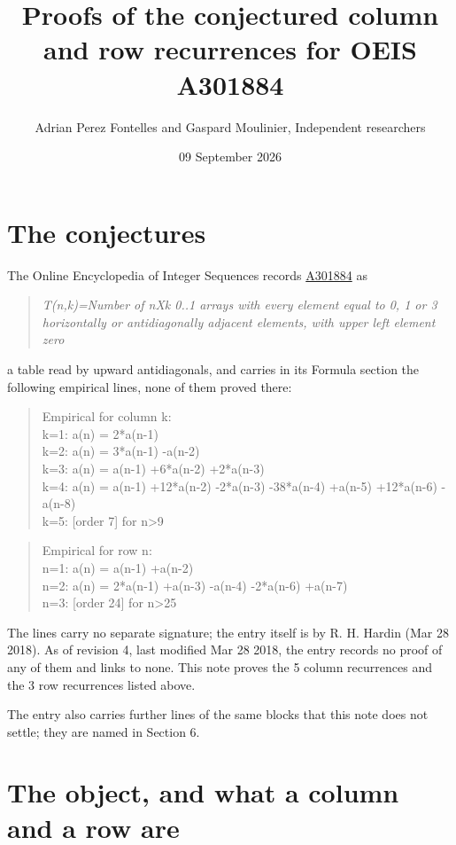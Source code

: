 \documentclass[11pt]{article}
\title{Proofs of the conjectured column and row recurrences for OEIS A301884}
\author{Adrian Perez Fontelles and Gaspard Moulinier, Independent researchers}
\date{09 September 2026}
\theoremstyle{definition}
\begin{document}
\maketitle
\section{The conjectures}

The Online Encyclopedia of Integer Sequences records \href{https://oeis.org/A301884}{A301884} as

\begin{quote}\itshape T(n,k)=Number of nXk 0..1 arrays with every element equal to 0, 1 or 3 horizontally or antidiagonally adjacent elements, with upper left element zero\end{quote}

a table read by upward antidiagonals, and carries in its Formula section the following empirical lines, none of them proved there:

\begin{quote}\ttfamily Empirical for column k:\\
k=1: a(n) = 2*a(n-1)\\k=2: a(n) = 3*a(n-1) -a(n-2)\\k=3: a(n) = a(n-1) +6*a(n-2) +2*a(n-3)\\k=4: a(n) = a(n-1) +12*a(n-2) -2*a(n-3) -38*a(n-4) +a(n-5) +12*a(n-6) -a(n-8)\\k=5: [order 7] for n>9\end{quote}

\begin{quote}\ttfamily Empirical for row n:\\
n=1: a(n) = a(n-1) +a(n-2)\\n=2: a(n) = 2*a(n-1) +a(n-3) -a(n-4) -2*a(n-6) +a(n-7)\\n=3: [order 24] for n>25\end{quote}

The lines carry no separate signature; the entry itself is by R. H. Hardin (Mar 28 2018). As of revision 4, last modified Mar 28 2018, the entry records no proof of any of them and links to none. This note proves the 5 column recurrences and the 3 row recurrences listed above.

The entry also carries further lines of the same blocks that this note does not settle; they are named in Section 6.

\section{The object, and what a column and a row are}
\end{document}

